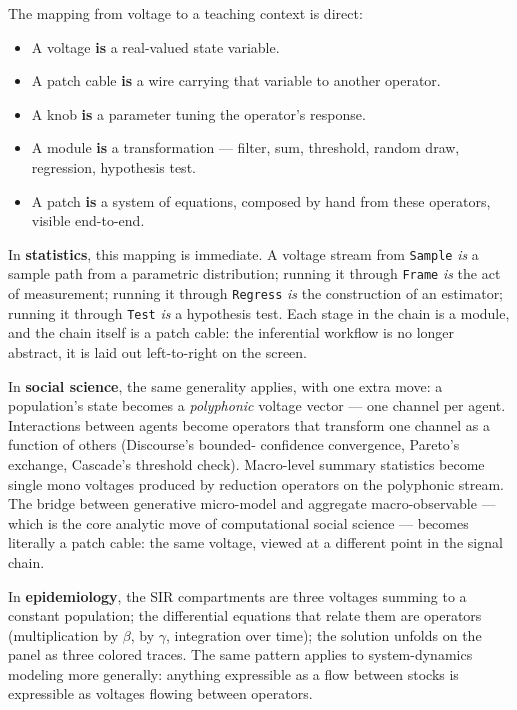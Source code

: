 The mapping from voltage to a teaching context is direct:

\begin{itemize}
\tightlist
\item
  A voltage \textbf{is} a real-valued state variable.
\item
  A patch cable \textbf{is} a wire carrying that variable to another
  operator.
\item
  A knob \textbf{is} a parameter tuning the operator's response.
\item
  A module \textbf{is} a transformation --- filter, sum, threshold,
  random draw, regression, hypothesis test.
\item
  A patch \textbf{is} a system of equations, composed by hand from these
  operators, visible end-to-end.
\end{itemize}

In \textbf{statistics}, this mapping is immediate. A voltage stream from
\texttt{Sample} \emph{is} a sample path from a parametric distribution;
running it through \texttt{Frame} \emph{is} the act of measurement;
running it through \texttt{Regress} \emph{is} the construction of an
estimator; running it through \texttt{Test} \emph{is} a hypothesis test.
Each stage in the chain is a module, and the chain itself is a patch
cable: the inferential workflow is no longer abstract, it is laid out
left-to-right on the screen.

In \textbf{social science}, the same generality applies, with one extra
move: a population's state becomes a \emph{polyphonic} voltage vector
--- one channel per agent. Interactions between agents become operators
that transform one channel as a function of others (Discourse's bounded-
confidence convergence, Pareto's exchange, Cascade's threshold check).
Macro-level summary statistics become single mono voltages produced by
reduction operators on the polyphonic stream. The bridge between
generative micro-model and aggregate macro-observable --- which is the
core analytic move of computational social science --- becomes literally
a patch cable: the same voltage, viewed at a different point in the
signal chain.

In \textbf{epidemiology}, the SIR compartments are three voltages
summing to a constant population; the differential equations that relate
them are operators (multiplication by \ensuremath{\beta}, by \ensuremath{\gamma}, integration over time);
the solution unfolds on the panel as three colored traces. The same
pattern applies to system-dynamics modeling more generally: anything
expressible as a flow between stocks is expressible as voltages flowing
between operators.

